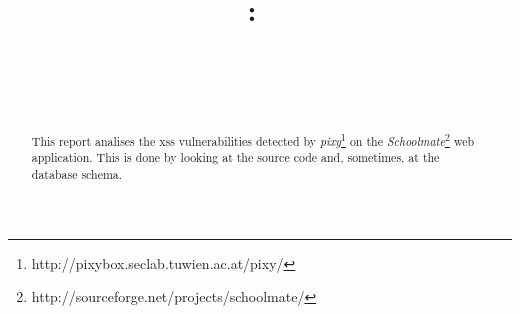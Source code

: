 \documentclass{article}
\title{
\vspace{2in}
\textmd{\textbf{\hmwkClass:\ \hmwkTitle}}\\
\textmd{\normalsize{\textbf{\hmwkSubTitle}}}\\
\vspace{3in}
}
\author{\textbf{\hmwkAuthorName} \\ \small{\hmwkAuthorSId}}
\date{} %
\begin{document}
\maketitle


\setcounter{tocdepth}{1} %

\newpage
\begin{abstract}
This report analises the xss vulnerabilities detected by \textit{pixy}\footnote{http://pixybox.seclab.tuwien.ac.at/pixy/} on the \textit{Schoolmate}\footnote{http://sourceforge.net/projects/schoolmate/} web application. This is done by looking at the source code and, sometimes, at the database schema. 
\end{abstract}
\tableofcontents
\newpage

\end{document}

